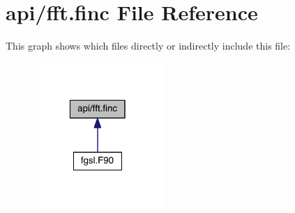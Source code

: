 \hypertarget{fft_8finc}{\section{api/fft.finc File Reference}
\label{fft_8finc}
}
This graph shows which files directly or indirectly include this file\-:
\nopagebreak
\begin{figure}[H]
\begin{center}
\leavevmode
\includegraphics[width=138pt]{fft_8finc__dep__incl}
\end{center}
\end{figure}
